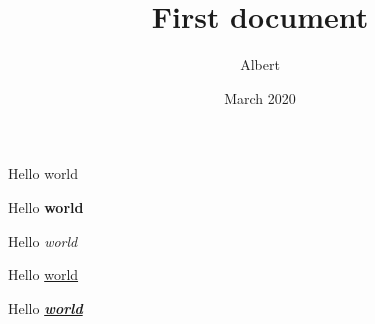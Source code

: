 \documentclass[12pt, a4paper]{article}
\title{First document}
\author{Albert}
\date{March 2020}
\begin{document}
\maketitle
Hello world

Hello \textbf{world}

Hello \textit{world}

Hello \underline{world}

Hello \underline{\textit{\textbf{world}}}
\end{document}
